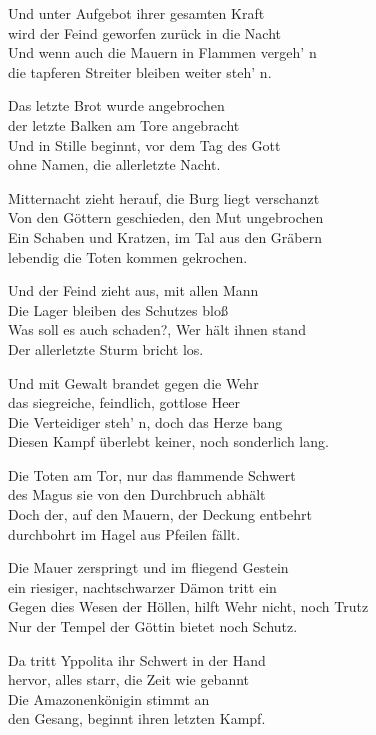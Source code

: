 Und unter Aufgebot ihrer gesamten Kraft\\
wird der Feind geworfen zurück in die Nacht\\
Und wenn auch die Mauern in Flammen vergeh' n\\
die tapferen Streiter bleiben weiter steh' n.

Das letzte Brot wurde angebrochen\\
der letzte Balken am Tore angebracht\\
Und in Stille beginnt, vor dem Tag des Gott\\
ohne Namen, die allerletzte Nacht.

Mitternacht zieht herauf, die Burg liegt verschanzt\\
Von den Göttern geschieden, den Mut ungebrochen\\
Ein Schaben und Kratzen, im Tal aus den Gräbern\\
lebendig die Toten kommen gekrochen.

Und der Feind zieht aus, mit allen Mann\\
Die Lager bleiben des Schutzes bloß\\
Was soll es auch schaden?, Wer hält ihnen stand\\
Der allerletzte Sturm bricht los.

Und mit Gewalt brandet gegen die Wehr\\
das siegreiche, feindlich, gottlose Heer\\
Die Verteidiger steh' n, doch das Herze bang\\
Diesen Kampf überlebt keiner, noch sonderlich lang.

Die Toten am Tor, nur das flammende Schwert\\
des Magus sie von den Durchbruch abhält\\
Doch der, auf den Mauern, der Deckung entbehrt\\
durchbohrt im Hagel aus Pfeilen fällt.

Die Mauer zerspringt und im fliegend Gestein\\
ein riesiger, nachtschwarzer Dämon tritt ein\\
Gegen dies Wesen der Höllen, hilft Wehr nicht, noch Trutz\\
Nur der Tempel der Göttin bietet noch Schutz.

Da tritt Yppolita ihr Schwert in der Hand\\
hervor, alles starr, die Zeit wie gebannt\\
Die Amazonenkönigin stimmt an\\
den Gesang, beginnt ihren letzten Kampf.

